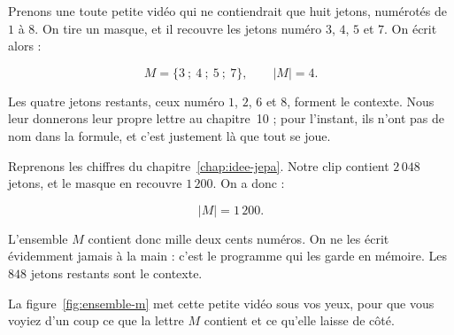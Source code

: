 \begin{exemple}
Prenons une toute petite vidéo qui ne contiendrait que huit jetons,
numérotés de $1$ à $8$. On tire un masque, et il recouvre les jetons
numéro $3$, $4$, $5$ et $7$. On écrit alors :

\[
  M = \{3 \ ; \ 4 \ ; \ 5 \ ; \ 7\} , \qquad |M| = 4 .
\]

Les quatre jetons restants, ceux numéro $1$, $2$, $6$ et $8$, forment le
contexte. Nous leur donnerons leur propre lettre au chapitre~10 ; pour
l'instant, ils n'ont pas de nom dans la formule, et c'est justement là que
tout se joue.
\end{exemple}

\begin{exemple}
Reprenons les chiffres du chapitre~\ref{chap:idee-jepa}. Notre clip contient
$2\,048$ jetons, et le masque en recouvre $1\,200$. On a donc :

\[
  |M| = 1\,200 .
\]

L'ensemble $M$ contient donc mille deux cents numéros. On ne les écrit
évidemment jamais à la main : c'est le programme qui les garde en mémoire.
Les $848$ jetons restants sont le contexte.
\end{exemple}

La figure~\ref{fig:ensemble-m} met cette petite vidéo sous vos yeux, pour
que vous voyiez d'un coup ce que la lettre $M$ contient et ce qu'elle laisse
de côté.

